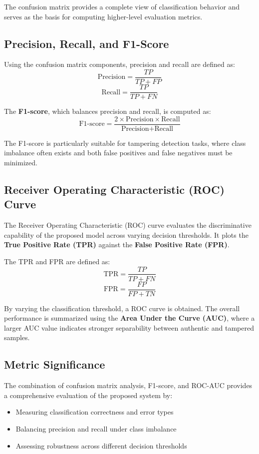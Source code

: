 \documentclass[12pt]{article}
\begin{document}
The confusion matrix provides a complete view of classification behavior and serves
as the basis for computing higher-level evaluation metrics.

\subsection{Precision, Recall, and F1-Score}

Using the confusion matrix components, precision and recall are defined as:
\[
    \text{Precision} = \frac{TP}{TP + FP}
\]
\[
    \text{Recall} = \frac{TP}{TP + FN}
\]

The \textbf{F1-score}, which balances precision and recall, is computed as:
\[
    \text{F1-score} = \frac{2 \times \text{Precision} \times \text{Recall}}
    {\text{Precision} + \text{Recall}}
\]

The F1-score is particularly suitable for tampering detection tasks, where class
imbalance often exists and both false positives and false negatives must be minimized.

\subsection{Receiver Operating Characteristic (ROC) Curve}

The Receiver Operating Characteristic (ROC) curve evaluates the discriminative
capability of the proposed model across varying decision thresholds. It plots the
\textbf{True Positive Rate (TPR)} against the \textbf{False Positive Rate (FPR)}.

The TPR and FPR are defined as:
\[
    \text{TPR} = \frac{TP}{TP + FN}
\]
\[
    \text{FPR} = \frac{FP}{FP + TN}
\]

By varying the classification threshold, a ROC curve is obtained. The overall
performance is summarized using the \textbf{Area Under the Curve (AUC)}, where a
larger AUC value indicates stronger separability between authentic and tampered
samples.

\subsection{Metric Significance}

The combination of confusion matrix analysis, F1-score, and ROC-AUC provides a
comprehensive evaluation of the proposed system by:
\begin{itemize}
    \item Measuring classification correctness and error types
    \item Balancing precision and recall under class imbalance
    \item Assessing robustness across different decision thresholds
\end{itemize}
\end{document}
